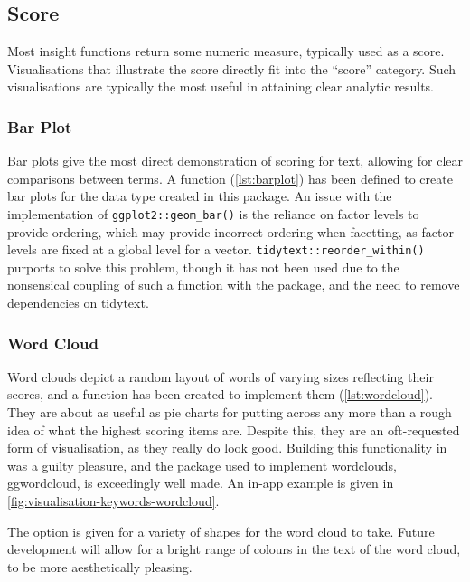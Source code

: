\message{ !name(jason-cairns-dissertation.tex)}\documentclass[11pt, a4paper, titlepage]{report}
\begin{document}
\subsection{Score}\label{sec:score}

Most insight functions return some numeric measure, typically used as
a score. Visualisations that illustrate the score directly fit into
the ``score'' category. Such visualisations are typically the most
useful in attaining clear analytic results.

\subsubsection{Bar Plot}\label{sec:bar-plot}

Bar plots give the most direct demonstration of scoring for text,
allowing for clear comparisons between terms. A function
(\cref{lst:barplot}) has been defined to create bar plots for
the data type created in this package. An issue with the
implementation of \texttt{ggplot2::geom_bar()} is the reliance
on factor levels to provide ordering, which may provide incorrect
ordering when facetting, as factor levels are fixed at a global level
for a vector. \texttt{tidytext::reorder_within()} purports to
solve this problem, though it has not been used due to the nonsensical
coupling of such a function with the package, and the need to remove
dependencies on tidytext.

\subsubsection{Word Cloud}\label{sec:word-cloud}

Word clouds depict a random layout of words of varying sizes
reflecting their scores, and a function has been created to implement
them (\cref{lst:wordcloud}). They are about as useful as pie charts
for putting across any more than a rough idea of what the highest
scoring items are. Despite this, they are an oft-requested form of
visualisation, as they really do look good. Building this
functionality in was a guilty pleasure, and the package used to
implement wordclouds, ggwordcloud, is exceedingly well
made\autocite{pennec19}. An in-app example is given in
\cref{fig:visualisation-keywords-wordcloud}.

The option is given for a variety of shapes for the word cloud to
take. Future development will allow for a bright range of colours in
the text of the word cloud, to be more aesthetically pleasing.
\end{document}
